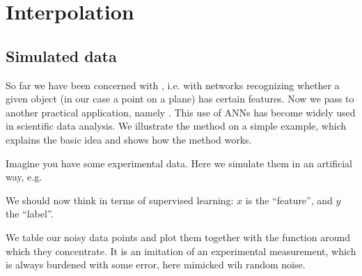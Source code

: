 \documentclass[letterpaper,10pt,english]{jupyterBook}
\begin{document}
\chapter{Interpolation}
\label{\detokenize{docs/interpol:interpolation}}\label{\detokenize{docs/interpol::doc}}

\section{Simulated data}
\label{\detokenize{docs/interpol:simulated-data}}
\sphinxAtStartPar
So far we have been concerned with , i.e. with networks recognizing whether a given object (in our case a point on a plane) has certain features. Now we pass to another practical application, namely . This use of ANNs has become widely used in scientific data analysis. We illustrate the method on a simple example, which explains the basic idea and shows how the method works.

\sphinxAtStartPar
Imagine you have some experimental data. Here we simulate them in an artificial way, e.g.

\begin{sphinxVerbatim}[commandchars=\\\{\}]
 
      

  
       
       
     \PYG{p}{[}\PYG{p}{]}
\end{sphinxVerbatim}

\sphinxAtStartPar
We should now think in terms of supervised learning: \(x\) is the “feature”, and \(y\) the “label”.

\sphinxAtStartPar
We table our noisy data points and plot them together with the function  around which they concentrate. It is an imitation of an experimental measurement, which is always burdened with some error, here mimicked wih random noise.
\end{document}
